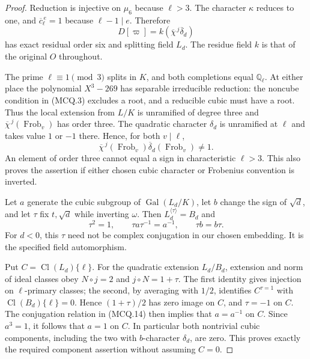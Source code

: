\begin{proof}
Reduction is injective on $\mu_6$ because $\ell>3$.
The character $\kappa$ reduces to one, and
$\overline c_\ell^{\,e}=1$ because $\ell-1\mid e$.
Therefore
\[
             D[\varpi]=k(\overline\chi^{\,j}\overline\delta_d)
 \tag{MCQ.12}
\]
has exact residual order six and splitting field $L_d$.
The residue field $k$ is that of the original $O$ throughout.

The prime $\ell\equiv1\pmod3$ splits in $K$, and both
completions equal $\mathbb Q_\ell$.  At either place the
polynomial $X^3-269$ has separable irreducible reduction:
the noncube condition in (MCQ.3) excludes a root, and a
reducible cubic must have a root.  Thus the local extension
from $L/K$ is unramified of degree three and
$\overline\chi^{\,j}(\operatorname{Frob}_v)$ has order three.
The quadratic character $\delta_d$ is unramified at $\ell$
and takes value $1$ or $-1$ there.  Hence, for both $v\mid\ell$,
\[
 \overline\chi^{\,j}(\operatorname{Frob}_v)
       \overline\delta_d(\operatorname{Frob}_v)\ne1.
 \tag{MCQ.13}
\]
An element of order three cannot equal a sign in characteristic
$\ell>3$.  This also proves the assertion if either chosen
cubic character or Frobenius convention is inverted.

Let $a$ generate the cubic subgroup of
$\operatorname{Gal}(L_d/K)$, let $b$ change the sign of
$\sqrt d$, and let $\tau$ fix $t,\sqrt d$ while inverting
$\omega$.  Then $L_d^{\langle\tau\rangle}=B_d$ and
\[
 \tau^2=1,\qquad \tau a\tau^{-1}=a^{-1},\qquad \tau b=b\tau.
 \tag{MCQ.14}
\]
For $d<0$, this $\tau$ need not be complex conjugation in
our chosen embedding.  It is the specified field automorphism.

Put $C=\operatorname{Cl}(L_d)\{\ell\}$.  For the quadratic
extension $L_d/B_d$, extension and norm of ideal classes obey
$N\circ j=2$ and $j\circ N=1+\tau$.
The first identity gives injection on $\ell$-primary classes;
the second, by averaging with $1/2$, identifies
$C^{\tau=1}$ with $\operatorname{Cl}(B_d)\{\ell\}=0$.
Hence $(1+\tau)/2$ has zero image on $C$, and $\tau=-1$
on $C$.  The conjugation relation in (MCQ.14) then implies
that $a=a^{-1}$ on $C$.  Since $a^3=1$, it follows that
$a=1$ on $C$.  In particular both nontrivial cubic components,
including the two with $b$-character $\delta_d$, are zero.
This proves exactly the required component assertion without
assuming $C=0$.


\end{proof}
